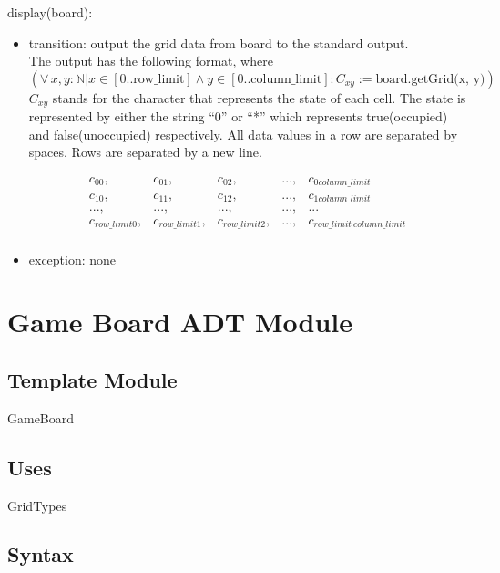 \documentclass[12pt]{article}
\begin{document}
\noindent display(board):
\begin{itemize}
\item transition: 
output the grid data from board to the standard output. \\
  The output has the following format, where $(\forall\, x, y: \mathbb{N} | x \in [0..\text{row\_limit}] \wedge y \in [0..\text{column\_limit}]: C_{xy} :=  \text{board.getGrid(x, y)})$ $C_{xy}$ stands for the character that represents the state of each cell. The state is
 represented by either the string ``0'' or ``*'' which represents true(occupied) and false(unoccupied) respectively. All data values in a row are separated by spaces.  Rows are
  separated by a new line.  

  \begin{equation}
    \begin{array}{ccccccc}
      c_{00}, & c_{01}, & c_{02}, &..., & c_{0column\_limit} \\
      c_{10}, & c_{11}, & c_{12}, &..., & c_{1column\_limit} \\
      ..., & ..., & ..., & ..., & ... \\
      c_{row\_limit0}, & c_{row\_limit1}, & c_{row\_limit2}, &..., & c_{row\_limit\ column\_limit} \\
    \end{array}
  \end{equation}

\item exception: none

\end{itemize}


\newpage


\section* {Game Board ADT Module}

\subsection*{Template Module}

GameBoard

\subsection* {Uses}

\noindent GridTypes

\subsection* {Syntax}
\end{document}
